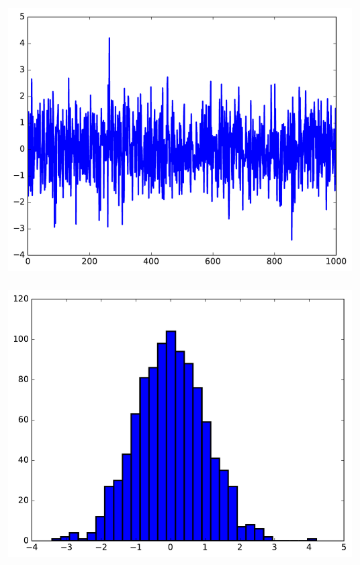 \begin{warn}
\begin{figure}[H] %
\centering
\begin{subfigure}{.496\textwidth}
    \centering
    \includegraphics[width=\linewidth]{figures/histogram_1_bad.pdf}
\end{subfigure}
%
\begin{subfigure}{.49\textwidth}
    \centering
    \includegraphics[width=\linewidth]{figures/histogram_1_good.pdf}
\end{subfigure}
\end{figure}
\end{warn}

